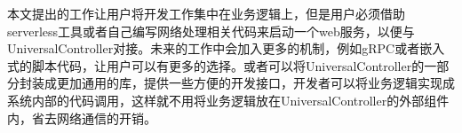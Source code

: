 \documentclass[macfonts,master]{njuthesis}
\begin{document}
本文提出的工作让用户将开发工作集中在业务逻辑上，但是用户必须借助serverless工具或者自己编写网络处理相关代码来启动一个web服务，以便与UniversalController对接。未来的工作中会加入更多的机制，例如gRPC或者嵌入式的脚本代码，让用户可以有更多的选择。或者可以将UniversalController的一部分封装成更加通用的库，提供一些方便的开发接口，开发者可以将业务逻辑实现成系统内部的代码调用，这样就不用将业务逻辑放在UniversalController的外部组件内，省去网络通信的开销。

\nocite{*}

%
%

\backmatter
%

\makelicense

\end{document}
